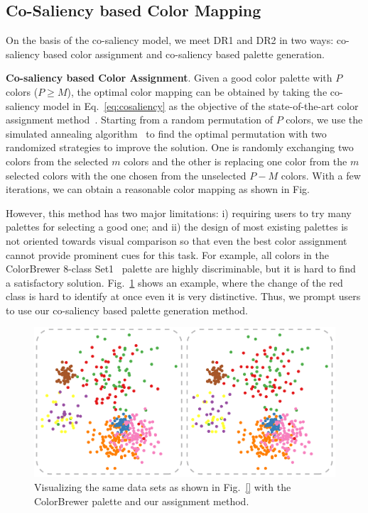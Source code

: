 \subsection{Co-Saliency based Color Mapping}
\label{subsec:solver}
On the basis of the co-saliency model, we meet DR1 and DR2 in two ways: co-saliency based color assignment and co-saliency based palette generation.

\vspace{1.5mm}
\noindent\textbf{Co-saliency based Color Assignment}.
Given a good color palette with $P$ colors ($P\geq M$), the optimal color mapping can be obtained by
taking the co-saliency model in Eq.~\ref{eq:cosaliency} as the objective of the state-of-the-art color assignment method~\cite{Wang2018}. Starting from a random permutation of $P$ colors, we use the simulated annealing algorithm~\cite{aarts1989stochastic} to find the optimal permutation with two randomized strategies to improve the solution. One is randomly exchanging two colors from the selected $m$ colors and the other is replacing one color from the $m$ selected colors with the one chosen from the unselected $P-M$ colors. With a few iterations, we can obtain a reasonable color mapping as shown in Fig.%

However, this method has two major limitations: i) requiring users to try many palettes for selecting a good one; and ii) the design of most existing palettes is not oriented towards visual comparison so that even the best color assignment cannot provide prominent cues for this task.
For example, all colors in the ColorBrewer 8-class Set1~\cite{harrower2003colorbrewer} palette are highly discriminable, but it is hard to find a satisfactory solution. Fig.~\ref{fig:colorbrewer} shows an example, where the change of the red class is hard to identify at once even it is very distinctive. Thus, we prompt users to use our co-saliency based palette generation method.

\begin{figure}[!tb]
\centering
\includegraphics[width=.9\columnwidth]{figures/colorbrewer.pdf}
\caption{Visualizing the same data sets as shown in Fig.~\ref{} with the ColorBrewer palette and our assignment method.}
\vspace*{-3mm}
\label{fig:colorbrewer}
\end{figure}

